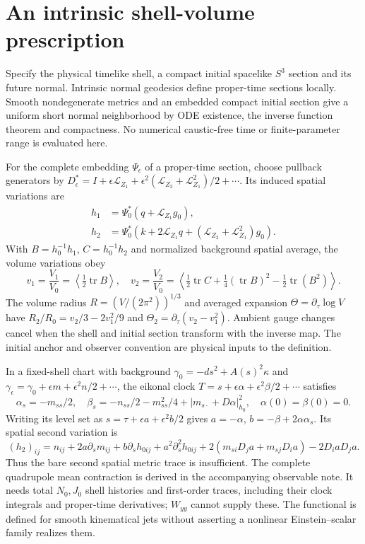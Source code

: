 \documentclass[11pt]{article}
\begin{document}
\section*{An intrinsic shell-volume prescription}
Specify the physical timelike shell, a compact initial spacelike $S^3$
section and its future normal. Intrinsic normal geodesics define
proper-time sections locally. Smooth nondegenerate metrics and an embedded
compact initial section give a uniform short normal neighborhood by ODE
existence, the inverse function theorem and compactness. No numerical
caustic-free time or finite-parameter range is evaluated here.

For the complete embedding $\Psi_\epsilon$ of a proper-time section,
choose pullback generators by
$D_\epsilon^*=I+\epsilon\mathcal L_{Z_1}
+\epsilon^2(\mathcal L_{Z_2}+\mathcal L_{Z_1}^2)/2+\cdots$.
Its induced spatial variations are
\begin{align*}
 h_1&=\Psi_0^*(q+\mathcal L_{Z_1}g_0),\\
 h_2&=\Psi_0^*(k+2\mathcal L_{Z_1}q+
             (\mathcal L_{Z_2}+\mathcal L_{Z_1}^2)g_0).
\end{align*}
With $B=h_0^{-1}h_1$, $C=h_0^{-1}h_2$ and normalized background
spatial average, the volume variations obey
\[
 v_1=\frac{V_1}{V_0}=\left\langle\tfrac12\operatorname{tr}B\right\rangle,
 \quad v_2=\frac{V_2}{V_0}=
 \left\langle\tfrac12\operatorname{tr}C+
 \tfrac14(\operatorname{tr}B)^2-\tfrac12\operatorname{tr}(B^2)\right\rangle.
\]
The volume radius $R=(V/(2\pi^2))^{1/3}$ and averaged expansion
$\Theta=\partial_\tau\log V$ have
$R_2/R_0=v_2/3-2v_1^2/9$ and
$\Theta_2=\partial_\tau(v_2-v_1^2)$.
Ambient gauge changes cancel when the shell and initial section transform
with the inverse map. The initial anchor and observer convention are
physical inputs to the definition.

In a fixed-shell chart with background
$\gamma_0=-ds^2+A(s)^2\kappa$ and
$\gamma_\epsilon=\gamma_0+\epsilon m+\epsilon^2n/2+\cdots$,
the eikonal clock $T=s+\epsilon\alpha+\epsilon^2\beta/2+\cdots$ satisfies
\[
 \alpha_s=-m_{ss}/2,\quad
 \beta_s=-n_{ss}/2-m_{ss}^2/4+|m_{s\cdot}+D\alpha|_{h_0}^2,
 \quad\alpha(0)=\beta(0)=0.
\]
Writing its level set as $s=\tau+\epsilon a+\epsilon^2b/2$ gives
$a=-\alpha$, $b=-\beta+2\alpha\alpha_s$. Its spatial second variation is
\[
 (h_2)_{ij}=n_{ij}+2a\partial_sm_{ij}+b\partial_sh_{0ij}
 +a^2\partial_s^2h_{0ij}
 +2(m_{si}D_ja+m_{sj}D_ia)-2D_iaD_ja.
\]
Thus the bare second spatial metric trace is insufficient. The complete
quadrupole mean contraction is derived in the accompanying observable
note. It needs total $N_0,J_0$ shell histories and first-order traces,
including their clock integrals and proper-time derivatives; $W_{yy}$
cannot supply these. The functional is defined for smooth kinematical
jets without asserting a nonlinear Einstein--scalar family realizes them.
\end{document}
